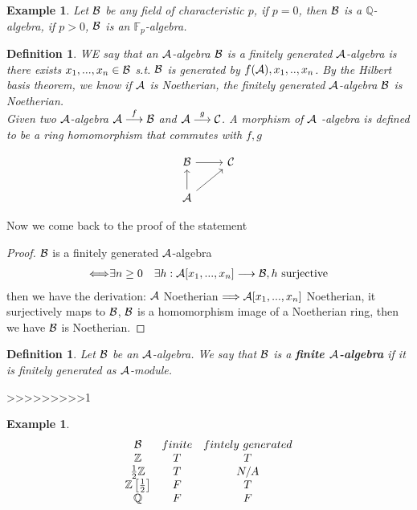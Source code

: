 \documentclass[11pt]{article}
\newtheorem{dfn}[thm]{Definition}
\newtheorem{ex}[thm]{Example}
\newcommand{\bbf}{\mathbb F}
\newcommand{\ratl}{\mathbb Q}
\newcommand{\cala}{{\cal A}}
\newcommand{\calb}{{\cal B}}
\newcommand{\calc}{{\cal C}}
\newcommand{\Lrta}{\Longrightarrow}
\newcommand{\lrta}{\longrightarrow}
\newcommand{\Llrta}{\Longleftrightarrow}
\begin{document}
\begin{ex}
Let $\calb$ be any field of characteristic $p$, if $p=0$, then $\calb$ is a $\ratl$-algebra, if $p>0$, $\calb$ is an $\bbf_p$-algebra.
\end{ex}

\begin{dfn}
WE say that an $\cala$-algebra $\calb$ is a finitely generated $\cala$-algebra is there exists $x_1,...,x_n\in \calb$ s.t. $\calb$ is generated by $f(\cala),x_1,..,x_n$. By the Hilbert basis theorem, we know if $\cala$ is Noetherian, the finitely generated $\cala$-algebra $\calb$ is Noetherian.\\

Given two $\cala$-algebra $\cala\overset{f}{\lrta}\calb$ and $\cala\overset{g}{\lrta}\calc$. A morphism of $\cala$ -algebra is defined to be a ring homomorphism that commutes with $f,g$

\[
\begin{tikzcd}
\calb\ar[r,]&\calc\\
\cala \ar[u]\ar[ur] 
\end{tikzcd}
\] 
\end{dfn}


Now we come back to the proof of the statement
\begin{proof}
$\calb$ is a finitely generated $\cala$-algebra\\
$$
\begin{aligned}
\Llrta &\exists n\geq 0
& \exists h:\cala[x_1,...,x_n]\lrta \calb, h\text{ surjective}
\end{aligned}
$$
then we have the derivation: $\cala$ Noetherian $\Lrta \cala[x_1,...,x_n]$ Noetherian, it surjectively maps to $\calb$, $\calb$ is a homomorphism image of a Noetherian ring, then we have $\calb$ is Noetherian.
\end{proof}

\begin{dfn}
Let $\calb$ be an $\cala$-algebra. We say that $\calb$ is a\textbf{ finite $\cala$-algebra} if it is finitely generated as $\cala$-module. 
 \end{dfn}
>>>>>>>>>1


\begin{ex}
\begin{equation*}
\begin{array}{ c c c }
\mathcal{B}  & finite & fintely\ generated\\
\mathbb{Z}  & T & T\\
\frac{1}{2}\mathbb{Z}  & T & N/A\\
\mathbb{Z}\left[\frac{1}{2}\right] & F & T\\
\mathbb{Q}  & F & F
\end{array}
\end{equation*}
\end{ex}
\end{document}
